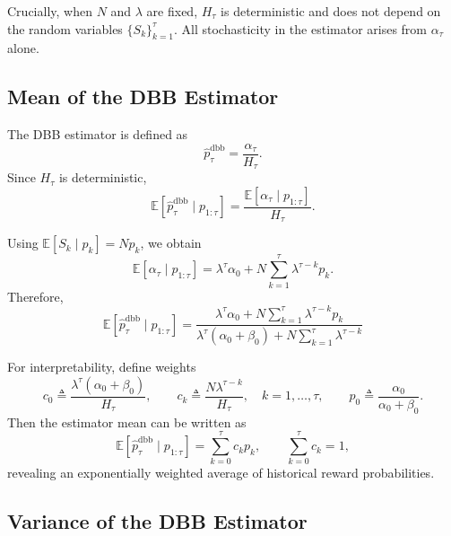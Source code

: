 Crucially, when $N$ and $\lambda$ are fixed, $H_\tau$ is deterministic and does not depend on the random variables $\{S_k\}_{k=1}^{\tau}$.
All stochasticity in the estimator arises from $\alpha_\tau$ alone.

\subsection{Mean of the DBB Estimator}

The DBB estimator is defined as
\begin{equation}
\hat{p}_\tau^{\mathrm{dbb}} = \frac{\alpha_\tau}{H_\tau}.
\end{equation}
Since $H_\tau$ is deterministic,
\begin{equation}
\mathbb{E}\!\left[\hat{p}_\tau^{\mathrm{dbb}} \mid p_{1:\tau}\right]
=
\frac{\mathbb{E}[\alpha_\tau \mid p_{1:\tau}]}{H_\tau}.
\end{equation}

Using $\mathbb{E}[S_k \mid p_k] = N p_k$, we obtain
\begin{equation}
\mathbb{E}[\alpha_\tau \mid p_{1:\tau}]
=
\lambda^\tau \alpha_0
+
N \sum_{k=1}^{\tau} \lambda^{\tau-k} p_k.
\end{equation}
Therefore,
\begin{equation}
\boxed{
\mathbb{E}\!\left[\hat{p}_\tau^{\mathrm{dbb}} \mid p_{1:\tau}\right]
=
\frac{\lambda^\tau \alpha_0 + N \sum_{k=1}^{\tau} \lambda^{\tau-k} p_k}
{\lambda^\tau(\alpha_0+\beta_0)+N \sum_{k=1}^{\tau} \lambda^{\tau-k}}
}
\label{eq:hb-mean}
\end{equation}

For interpretability, define weights
\begin{equation}
c_0 \triangleq \frac{\lambda^\tau(\alpha_0+\beta_0)}{H_\tau},
\qquad
c_k \triangleq \frac{N\lambda^{\tau-k}}{H_\tau}, \quad k=1,\dots,\tau,
\qquad
p_0 \triangleq \frac{\alpha_0}{\alpha_0+\beta_0}.
\end{equation}
Then the estimator mean can be written as
\begin{equation}
\boxed{
\mathbb{E}\!\left[\hat{p}_\tau^{\mathrm{dbb}} \mid p_{1:\tau}\right]
=
\sum_{k=0}^{\tau} c_k p_k,
\qquad
\sum_{k=0}^{\tau} c_k = 1,
}
\label{eq:hb-mean-weighted}
\end{equation}
revealing an exponentially weighted average of historical reward probabilities.

\subsection{Variance of the DBB Estimator}


